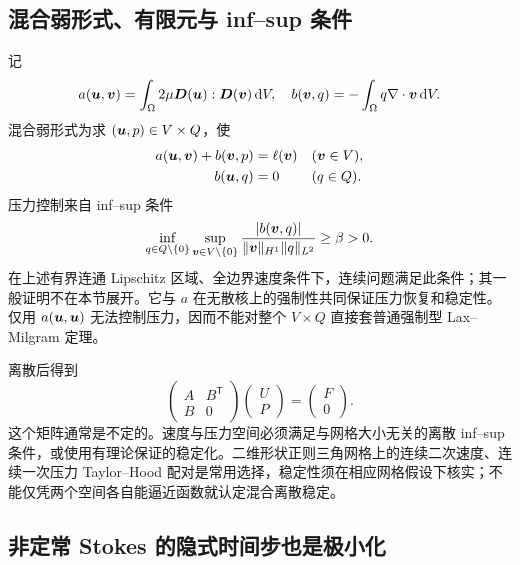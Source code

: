\subsection{混合弱形式、有限元与 inf--sup 条件}

记
\begin{equation}
 a(\bm{u},\bm{v})=\int_\Omega2\mu\bm{D}(\bm{u}):\bm{D}(\bm{v})\,\mathrm d V,
 \quad b(\bm{v},q)=-\int_\Omega q\nabla\cdot\bm{v}\,\mathrm d V.
\end{equation}
混合弱形式为求 $(\bm{u},p)\in V\times Q$，使
\begin{equation}
 \begin{aligned}
 a(\bm{u},\bm{v})+b(\bm{v},p)&=\ell(\bm{v})&& (\bm{v}\in V),\\
 b(\bm{u},q)&=0&&(q\in Q).
 \end{aligned}\label{eq:stokes-mixed-abstract}
\end{equation}
压力控制来自 inf--sup 条件
\begin{equation}
 \inf_{q\in Q\setminus\{0\}}\sup_{\bm{v}\in V\setminus\{0\}}
 \frac{|b(\bm{v},q)|}{\|\bm{v}\|_{H^1}\|q\|_{L^2}}\ge\beta>0.
\end{equation}
在上述有界连通 Lipschitz 区域、全边界速度条件下，连续问题满足此条件；其一般证明不在本节展开。它与 $a$ 在无散核上的强制性共同保证压力恢复和稳定性。仅用 $a(\bm{u},\bm{u})$ 无法控制压力，因而不能对整个 $V\times Q$ 直接套普通强制型 Lax--Milgram 定理。

离散后得到
\begin{equation}
 \begin{pmatrix}A&B^{\mathsf T}\\B&0\end{pmatrix}
 \begin{pmatrix}U\\P\end{pmatrix}
 =\begin{pmatrix}F\\0\end{pmatrix}.
\end{equation}
这个矩阵通常是不定的。速度与压力空间必须满足与网格大小无关的离散 inf--sup 条件，或使用有理论保证的稳定化。二维形状正则三角网格上的连续二次速度、连续一次压力 Taylor--Hood 配对是常用选择，稳定性须在相应网格假设下核实；不能仅凭两个空间各自能逼近函数就认定混合离散稳定。

\subsection{非定常 Stokes 的隐式时间步也是极小化}

